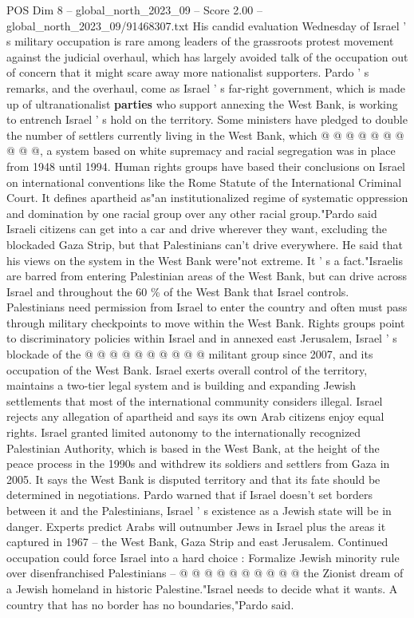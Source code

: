 \begin{textsample}{POS Dim 8 – global\_north\_2023\_09 – Score 2.00 – global\_north\_2023\_09/91468307.txt}
His candid evaluation Wednesday of Israel ' s military occupation is rare among leaders of the grassroots protest movement against the judicial overhaul, which has largely avoided talk of the occupation out of concern that it might scare away more nationalist supporters.
Pardo ' s remarks, and the overhaul, come as Israel ' s far-right government, which is made up of ultranationalist \textbf{parties} who support annexing the West Bank, is working to entrench Israel ' s hold on the territory.
Some ministers have pledged to double the number of settlers currently living in the West Bank, which @ @ @ @ @ @ @ @ @ @, a system based on white supremacy and racial segregation was in place from 1948 until 1994.
Human rights groups have based their conclusions on Israel on international conventions like the Rome Statute of the International Criminal Court.
It defines apartheid as"an institutionalized regime of systematic oppression and domination by one racial group over any other racial group."Pardo said Israeli citizens can get into a car and drive wherever they want, excluding the blockaded Gaza Strip, but that Palestinians can't drive everywhere.
He said that his views on the system in the West Bank were"not extreme.
It ' s a fact."Israelis are barred from entering Palestinian areas of the West Bank, but can drive across Israel and throughout the 60 \% of the West Bank that Israel controls.
Palestinians need permission from Israel to enter the country and often must pass through military checkpoints to move within the West Bank.
Rights groups point to discriminatory policies within Israel and in annexed east Jerusalem, Israel ' s blockade of the @ @ @ @ @ @ @ @ @ @ militant group since 2007, and its occupation of the West Bank.
Israel exerts overall control of the territory, maintains a two-tier legal system and is building and expanding Jewish settlements that most of the international community considers illegal.
Israel rejects any allegation of apartheid and says its own Arab citizens enjoy equal rights.
Israel granted limited autonomy to the internationally recognized Palestinian Authority, which is based in the West Bank, at the height of the peace process in the 1990s and withdrew its soldiers and settlers from Gaza in 2005.
It says the West Bank is disputed territory and that its fate should be determined in negotiations.
Pardo warned that if Israel doesn't set borders between it and the Palestinians, Israel ' s existence as a Jewish state will be in danger.
Experts predict Arabs will outnumber Jews in Israel plus the areas it captured in 1967 -- the West Bank, Gaza Strip and east Jerusalem.
Continued occupation could force Israel into a hard choice : Formalize Jewish minority rule over disenfranchised Palestinians -- @ @ @ @ @ @ @ @ @ @ the Zionist dream of a Jewish homeland in historic Palestine."Israel needs to decide what it wants.
A country that has no border has no boundaries,"Pardo said.

\end{textsample}
